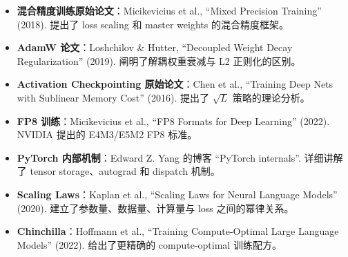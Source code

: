 \documentclass[a4paper]{article}
\begin{document}
\begin{itemize}
    \item \textbf{混合精度训练原始论文}：Micikevicius et al., ``Mixed Precision Training'' (2018). 提出了 loss scaling 和 master weights 的混合精度框架。
    \item \textbf{AdamW 论文}：Loshchilov \& Hutter, ``Decoupled Weight Decay Regularization'' (2019). 阐明了解耦权重衰减与 L2 正则化的区别。
    \item \textbf{Activation Checkpointing 原始论文}：Chen et al., ``Training Deep Nets with Sublinear Memory Cost'' (2016). 提出了 $\sqrt{L}$ 策略的理论分析。
    \item \textbf{FP8 训练}：Micikevicius et al., ``FP8 Formats for Deep Learning'' (2022). NVIDIA 提出的 E4M3/E5M2 FP8 标准。
    \item \textbf{PyTorch 内部机制}：Edward Z. Yang 的博客 ``PyTorch internals''. 详细讲解了 tensor storage、autograd 和 dispatch 机制。
    \item \textbf{Scaling Laws}：Kaplan et al., ``Scaling Laws for Neural Language Models'' (2020). 建立了参数量、数据量、计算量与 loss 之间的幂律关系。
    \item \textbf{Chinchilla}：Hoffmann et al., ``Training Compute-Optimal Large Language Models'' (2022). 给出了更精确的 compute-optimal 训练配方。
\end{itemize}
\end{document}
